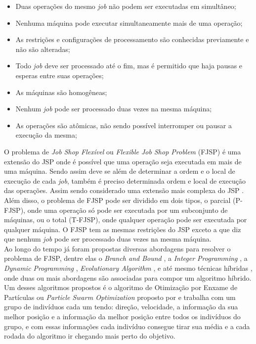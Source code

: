 \begin{itemize}
    \item Duas operações do mesmo \textit{job} não podem ser executadas em simultâneo;
    \item Nenhuma máquina pode executar simultaneamente mais de uma operação;
    \item As restrições e configurações de processamento são conhecidas previamente e não são alteradas;
    \item Todo \textit{job} deve ser processado até o fim, mas é permitido que haja pausas e esperas entre suas operações;
    \item As máquinas são homogêneas;
    \item Nenhum \textit{job} pode ser processado duas vezes na mesma máquina;
    \item As operações são atômicas, não sendo possível interromper ou pausar a execução da mesma;
\end{itemize}
O problema de \textit{Job Shop Flexível} ou \textit{Flexible Job Shop Problem} (FJSP) é uma extensão do JSP onde é possível que uma operação seja executada em mais de uma máquina. Sendo assim deve se além de determinar a ordem e o local de execução de cada \textit{job}, também é preciso determinada ordem e local de execução das operações. Assim sendo considerado uma extensão mais complexa do JSP \cite{Jansen2000}.\\
Além disso, o problema de FJSP pode ser dividido em dois tipos, o parcial (P-FJSP), onde uma operação só pode ser executada por um subconjunto de máquinas, ou o total (T-FJSP), onde qualquer operação pode ser executada por qualquer máquina. O FJSP tem as mesmas restrições do JSP exceto a que diz que nenhum \textit{job} pode ser processado duas vezes na mesma máquina.\\
Ao longo do tempo já foram propostas diversas abordagens para resolver o problema de FJSP, dentre elas o \textit{Branch and Bound} \cite{Nababan2008}, a 
\textit{Integer Programming} \cite{Pan2007}, a 
\textit{Dynamic Programming} \cite{Gromicho2012}, 
\textit{Evolutionary Algorithm} \cite{Pezzella2008}, e até mesmo técnicas híbridas \cite{Zhang2009}, onde duas ou mais abordagens são associadas para compor um algoritmo híbrido.\\
Um desses algoritmos propostos é o algoritmo de Otimização por Enxame de Partículas ou \textit{Particle Swarm Optimization} proposto por \cite{Kennedy1995} e trabalha com um grupo de indivíduos cada um tendo: direção, velocidade, a informação da sua melhor posição e a informação da melhor posição entre todos os indivíduos do grupo, e com essas informações cada indivíduo consegue tirar sua média e a cada rodada do algoritmo ir chegando mais perto do objetivo.\\
